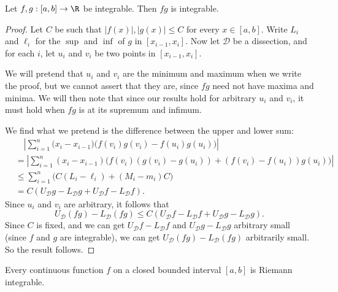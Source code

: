 \documentclass[a4paper]{article}
\begin{document}
\begin{prop}
  Let $f, g: [a, b] \to \R$ be integrable. Then $fg$ is integrable.
\end{prop}

\begin{proof}
  Let $C$ be such that $|f(x)|, |g(x)| \leq C$ for every $x\in [a, b]$. Write $L_i$ and $\ell_i$ for the $\sup$ and $\inf$ of $g$ in $[x_{i - 1}, x_i]$. Now let $\mathcal{D}$ be a dissection, and for each $i$, let $u_i$ and $v_i$ be two points in $[x_{i - 1}, x_i]$.

  We will pretend that $u_i$ and $v_i$ are the minimum and maximum when we write the proof, but we cannot assert that they are, since $fg$ need not have maxima and minima. We will then note that since our results hold for arbitrary $u_i$ and $v_i$, it must hold when $fg$ is at its supremum and infimum.

  We find what we pretend is the difference between the upper and lower sum:
  \begin{align*}
    &\quad \left|\sum_{i = 1}^n \big(x_i - x_{i - 1})(f(v_i)g(v_i) - f(u_i)g(u_i)\big)\right| \\
    &= \left|\sum_{i = 1}^{n}(x_i - x_{i - 1})\big(f(v_i)(g(v_i) - g(u_i)) + (f(v_i) - f(u_i))g(u_i)\big)\right|\\
    &\leq \sum_{i = 1}^n \big(C(L_i - \ell_i) + (M_i - m_i)C\big)\\
    &=C(U_\mathcal{D}g - L_\mathcal{D}g + U_\mathcal{D}f - L_\mathcal{D}f).
  \end{align*}
  Since $u_i$ and $v_i$ are arbitrary, it follows that
  \[
    U_\mathcal{D}(fg) - L_\mathcal{D}(fg) \leq C(U_\mathcal{D}f - L_\mathcal{D}f + U_\mathcal{D}g - L_\mathcal{D}g).
  \]
  Since $C$ is fixed, and we can get $U_\mathcal{D} f - L_\mathcal{D}f$ and $U_\mathcal{D}g - L_\mathcal{D}g$ arbitrary small (since $f$ and $g$ are integrable), we can get $U_\mathcal{D}(fg) - L_\mathcal{D}(fg)$ arbitrarily small. So the result follows.
\end{proof}

\begin{thm}
  Every continuous function $f$ on a closed bounded interval $[a, b]$ is Riemann integrable.
\end{thm}
\end{document}
